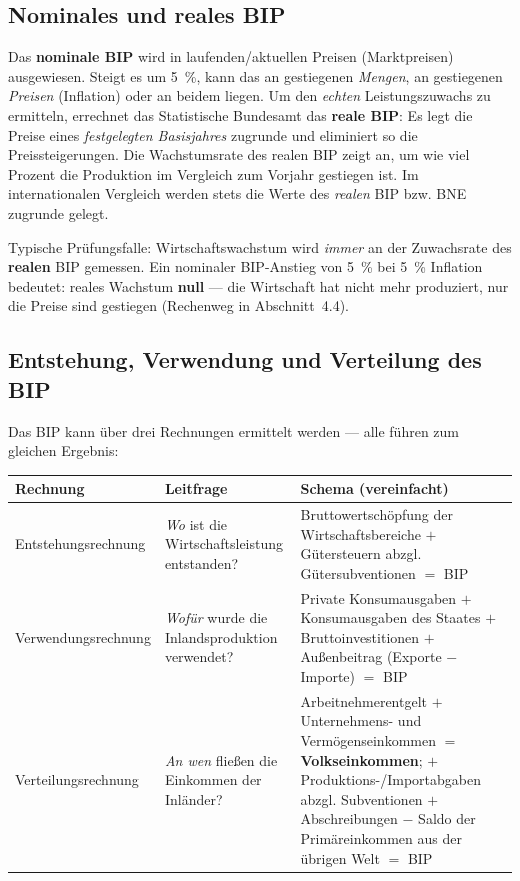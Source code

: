 \documentclass[11pt, a4paper]{article}
\begin{document}
\subsection{Nominales und reales BIP}

Das \textbf{nominale BIP} wird in laufenden/aktuellen Preisen (Marktpreisen) ausgewiesen.
Steigt es um 5~\%, kann das an gestiegenen \emph{Mengen}, an gestiegenen \emph{Preisen}
(Inflation) oder an beidem liegen. Um den \emph{echten} Leistungszuwachs zu ermitteln,
errechnet das Statistische Bundesamt das \textbf{reale BIP}: Es legt die Preise eines
\emph{festgelegten Basisjahres} zugrunde und eliminiert so die Preissteigerungen. Die
Wachstumsrate des realen BIP zeigt an, um wie viel Prozent die Produktion im Vergleich
zum Vorjahr gestiegen ist. Im internationalen Vergleich werden stets die Werte des
\emph{realen} BIP bzw. BNE zugrunde gelegt.

\begin{achtung}
Typische Prüfungsfalle: Wirtschaftswachstum wird \emph{immer} an der Zuwachsrate des
\textbf{realen} BIP gemessen. Ein nominaler BIP-Anstieg von 5~\% bei 5~\% Inflation
bedeutet: reales Wachstum \textbf{null} --- die Wirtschaft hat nicht mehr produziert,
nur die Preise sind gestiegen (Rechenweg in Abschnitt~4.4).
\end{achtung}

\subsection{Entstehung, Verwendung und Verteilung des BIP}

Das BIP kann über drei Rechnungen ermittelt werden --- alle führen zum gleichen Ergebnis:

\begin{center}
\begin{tabular}{p{3.4cm} p{4.6cm} p{6.4cm}}
\toprule
\textbf{Rechnung} & \textbf{Leitfrage} & \textbf{Schema (vereinfacht)}\\
\midrule
Entstehungs\-rechnung & \emph{Wo} ist die Wirtschaftsleistung entstanden? & Bruttowertschöpfung der Wirtschaftsbereiche $+$ Gütersteuern abzgl. Gütersubventionen $=$ BIP\\
Verwendungs\-rechnung & \emph{Wofür} wurde die Inlandsproduktion verwendet? & Private Konsumausgaben $+$ Konsumausgaben des Staates $+$ Bruttoinvestitionen $+$ Außenbeitrag (Exporte $-$ Importe) $=$ BIP\\
Verteilungs\-rechnung & \emph{An wen} fließen die Einkommen der Inländer? & Arbeitnehmerentgelt $+$ Unternehmens- und Vermögenseinkommen $=$ \textbf{Volkseinkommen}; $+$ Produktions-/Importabgaben abzgl. Subventionen $+$ Abschreibungen $-$ Saldo der Primäreinkommen aus der übrigen Welt $=$ BIP\\
\bottomrule
\end{tabular}
\end{center}
\end{document}
